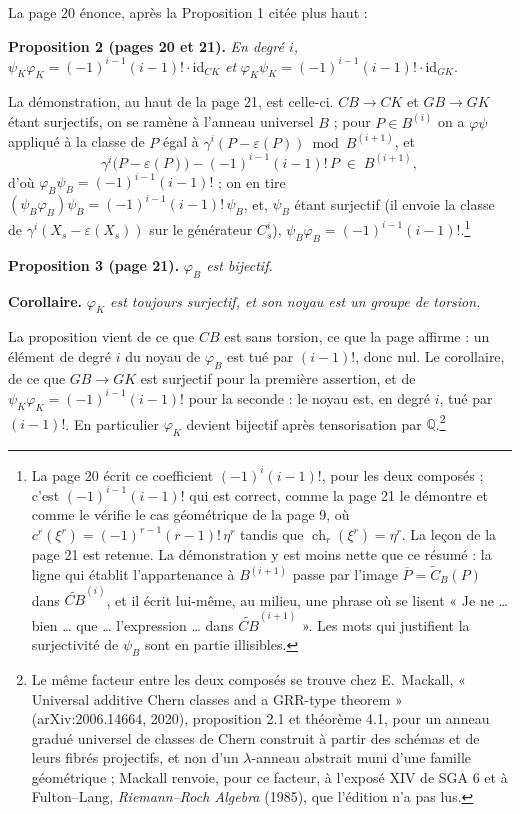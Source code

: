 \documentclass[11pt,a4paper]{article}
\begin{document}
La page 20 énonce, après la Proposition 1 citée plus haut :

\textbf{Proposition 2 (pages 20 et 21).} \emph{En degré $i$,}
$\psi_{K}\varphi_{K} = (-1)^{i-1}(i-1)! \cdot \mathrm{id}_{CK}$ \emph{et}
$\varphi_{K}\psi_{K} = (-1)^{i-1}(i-1)! \cdot \mathrm{id}_{GK}$.

La démonstration, au haut de la page 21, est celle-ci. $CB \to CK$ et
$GB \to GK$ étant surjectifs, on se ramène à l'anneau universel $B$ ; pour
$P \in B^{(i)}$ on a $\varphi\psi$ appliqué à la classe de $P$ égal à
$\gamma^{i}(P - \varepsilon(P)) \bmod B^{(i+1)}$, et
\[
  \gamma^{i}\bigl(P - \varepsilon(P)\bigr) - (-1)^{i-1}(i-1)!\,P
  \;\in\; B^{(i+1)} ,
\]
d'où $\varphi_{B}\psi_{B} = (-1)^{i-1}(i-1)!$ ; on en tire
$(\psi_{B}\varphi_{B})\psi_{B} = (-1)^{i-1}(i-1)!\,\psi_{B}$, et, $\psi_{B}$
étant surjectif (il envoie la classe de $\gamma^{i}(X_{s} - \varepsilon(X_{s}))$
sur le générateur $C^{i}_{s}$), $\psi_{B}\varphi_{B} =
(-1)^{i-1}(i-1)!$.\footnote{La page 20 écrit ce coefficient $(-1)^{i}(i-1)!$,
pour les deux composés ; c'est $(-1)^{i-1}(i-1)!$ qui est correct, comme la
page 21 le démontre et comme le vérifie le cas géométrique de la page 9, où
$c^{r}(\xi^{r}) = (-1)^{r-1}(r-1)!\,\eta^{r}$ tandis que
$\operatorname{ch}_{r}(\xi^{r}) = \eta^{r}$. La leçon de la page 21 est
retenue. La démonstration y est moins nette que ce résumé : la ligne qui
établit l'appartenance à $B^{(i+1)}$ passe par l'image $\overline{P} =
\widetilde{C}_{B}(P)$ dans $\widetilde{CB}^{(i)}$, et il écrit lui-même,
au milieu, une phrase où se lisent « Je ne \ldots{} bien \ldots{} que
\ldots{} l'expression \ldots{} dans $\widetilde{CB}^{(i+1)}$ ». Les mots qui
justifient la surjectivité de $\psi_{B}$ sont en partie illisibles.}

\textbf{Proposition 3 (page 21).} \emph{$\varphi_{B}$ est bijectif.}

\textbf{Corollaire.} \emph{$\varphi_{K}$ est toujours surjectif, et son noyau
est un groupe de torsion.}

La proposition vient de ce que $CB$ est sans torsion, ce que la page affirme :
un élément de degré $i$ du noyau de $\varphi_{B}$ est tué par $(i-1)!$, donc
nul. Le corollaire, de ce que $GB \to GK$ est surjectif pour la première
assertion, et de $\psi_{K}\varphi_{K} = (-1)^{i-1}(i-1)!$ pour la seconde : le
noyau est, en degré $i$, tué par $(i-1)!$. En particulier $\varphi_{K}$ devient
bijectif après tensorisation par $\mathbb{Q}$.\footnote{Le même facteur
entre les deux composés se trouve chez E.~Mackall, « Universal additive Chern
classes and a GRR-type theorem » (arXiv:2006.14664, 2020), proposition 2.1 et
théorème 4.1, pour un anneau gradué universel de classes de Chern construit à
partir des schémas et de leurs fibrés projectifs, et non d'un $\lambda$-anneau
abstrait muni d'une famille géométrique ; Mackall renvoie, pour ce facteur, à
l'exposé XIV de SGA 6 et à Fulton--Lang, \emph{Riemann--Roch Algebra} (1985),
que l'édition n'a pas lus.}
\end{document}

